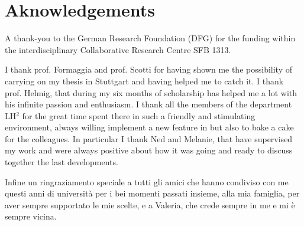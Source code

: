 \chapter*{Aknowledgements}
A thank-you to the German Research Foundation (DFG) for the funding within the interdisciplinary Collaborative Research Centre SFB 1313.

I thank prof. Formaggia and prof. Scotti for having shown me the possibility of carrying on my thesis in Stuttgart and having helped me to catch it.
I thank prof. Helmig, that during my six months of scholarship has helped me a lot with his infinite passion and enthusiasm.
I thank all the members of the department LH$^2$ for the great time spent there in such a friendly and stimulating environment, always willing implement a new feature in \DUMUX but also to bake a cake for the colleagues. In particular I thank Ned and Melanie, that have supervised my work and were always positive about how it was going and ready to discuss together the last developments.

Infine un ringraziamento speciale a tutti gli amici che hanno condiviso con me questi anni di università per i bei momenti passati insieme, alla mia famiglia, per aver sempre supportato le mie scelte, e a Valeria, che crede sempre in me e mi è sempre vicina.
